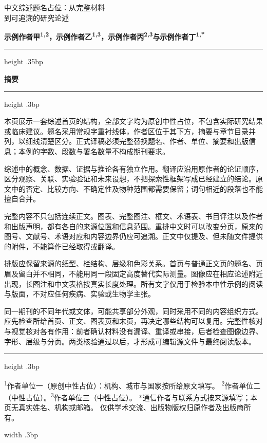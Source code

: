 \documentclass[UTF8,fontset=none,scheme=plain]{ctexart}
\renewcommand{\normalsize}{\fontsize{9.05bp}{12.1bp}\selectfont}
\begin{document}
\normalsize
{\noindent\mdseries\fontsize{25bp}{29bp}\selectfont 中文综述题名占位：从完整材料\\到可追溯的研究论述\par}\vspace{35bp}
{\noindent\sffamily\bfseries\fontsize{9bp}{11.5bp}\selectfont 示例作者甲\textsuperscript{1,2}，示例作者乙\textsuperscript{1,3}，示例作者丙\textsuperscript{2,3}与示例作者丁\textsuperscript{1,*}\par}
\vspace{4bp}\hrule height .35bp\vspace{4bp}
\noindent\begin{minipage}[t][519bp][t]{388.0bp}\vspace{0pt}
{\sffamily\bfseries\fontsize{10bp}{12bp}\selectfont 摘要\par}\vspace{17bp}\hrule height .3bp\vspace{5bp}
{\fontsize{11.5bp}{16bp}\selectfont\setlength{\parindent}{0pt}
本页展示一套综述首页的结构，全部文字均为原创中性占位，不包含实际研究结果或临床建议。题名采用常规字重衬线体，作者区位于其下方，摘要与章节目录并列，以细线清楚区分。正式译稿必须完整替换题名、作者、单位、摘要和出版信息；本例的字数、段数与署名数量不构成期刊要求。\par\smallskip
综述中的概念、数据、证据与推论各有独立作用。翻译应沿用原作者的论证顺序，区分观察、关联、实验验证和未来设想，不把探索性框架写成已经建立的结论。原文中的否定、比较方向、不确定性及物种范围都需要保留；词句相近的段落也不能擅自合并。\par\smallskip
完整内容不只包括连续正文。图表、完整图注、框文、术语表、书目评注以及作者和出版声明，都有各自的来源位置和信息范围。重排中文时可以改变分页，原来的图号、文献号、术语对应和内容边界仍应可追溯。正文中仅提及、但未随文件提供的附件，不能算作已经取得或翻译。\par\smallskip
排版应保留来源的纸型、栏结构、层级和色彩关系。首页与普通正文页的题名、页眉及留白并不相同，不能用同一段固定高度替代实际测量。图像应在相应论述附近出现，长图注和中文表格按真实长度处理。所有文字仅用于检验本中性示例的阅读与版面，不对应任何疾病、实验或生物学主张。\par\smallskip
同一期刊的不同年代或文体，可能共享部分外观，同时采用不同的内容组织方式。应先检查所给首页、正文、图表页和末页，再决定哪些结构可以复用。完整性核对与视觉核对各有作用：前者确认材料没有漏译、重译或串接，后者检查图像边界、字形、层级与分页。两类核验通过以后，才形成可编辑源文件与最终阅读版本。\par}
\vfill\hrule height .3bp\vspace{4bp}
{\sffamily\fontsize{7.2bp}{9.4bp}\selectfont\noindent
\textsuperscript{1}作者单位一（原创中性占位）：机构、城市与国家按所给原文填写。
\textsuperscript{2}作者单位二（中性占位）。\textsuperscript{3}作者单位三（中性占位）。
*通信作者与联系方式按来源填写；本页无真实姓名、机构或邮箱。
仅供学术交流、出版物版权归原作者及出版商所有。\par}
\end{minipage}\hfill\vrule width .3bp\hfill
\end{document}
